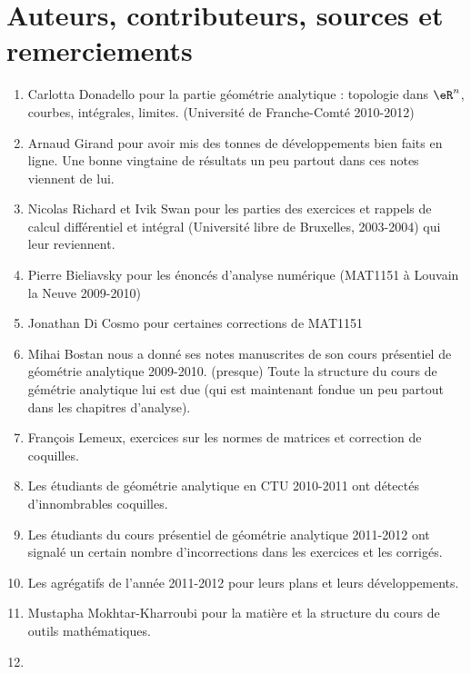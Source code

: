\section*{Auteurs, contributeurs, sources et remerciements}

\begin{enumerate}
    \item Carlotta Donadello pour la partie géométrie analytique : topologie dans \( \eR^n\), courbes, intégrales, limites. (Université de Franche-Comté 2010-2012)
    \item 
        Arnaud Girand pour avoir mis des tonnes de développements bien faits en ligne. Une bonne vingtaine de résultats un peu partout dans ces notes viennent de lui.
    \item Nicolas Richard et Ivik Swan pour les parties des exercices et rappels de calcul différentiel et intégral (Université libre de Bruxelles, 2003-2004) qui leur reviennent.
    \item Pierre Bieliavsky pour les énoncés d'analyse numérique (MAT1151 à Louvain la Neuve 2009-2010)
    \item Jonathan Di Cosmo pour certaines corrections de MAT1151
    \item
        Mihai Bostan nous a donné ses notes manuscrites de son cours présentiel de géométrie analytique 2009-2010. (presque) Toute la structure du cours de gémétrie analytique lui est due (qui est maintenant fondue un peu partout dans les chapitres d'analyse).
    \item
        François Lemeux, exercices sur les normes de matrices et correction de coquilles.
    \item
        Les étudiants de géométrie analytique en CTU 2010-2011 ont détectés d'innombrables coquilles.
    \item
        Les étudiants du cours présentiel de géométrie analytique 2011-2012 ont signalé un certain nombre d'incorrections dans les exercices et les corrigés.
    \item
        Les agrégatifs de l'année 2011-2012 pour leurs plans et leurs développements.
    \item
        Mustapha Mokhtar-Kharroubi pour la matière et la structure du cours de outils mathématiques.
    \item

\end{enumerate}
